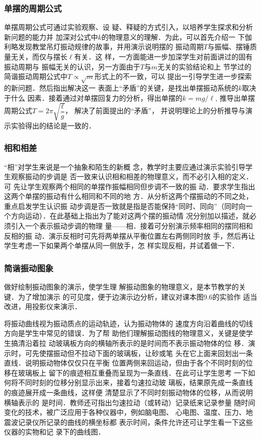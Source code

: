 \subsubsection{单摆的周期公式}

单摆周期公式可通过实验观察、设
疑、释疑的方式引入，以培养学生探求和分析新问题的能力并
加深对公式中$k$的物理意义的理解．为此，可以首先介绍一
下伽利略发现教堂吊灯振动规律的故事，并用演示说明摆的
振动周期$T$与振幅、摆锤质量无关，而仅与摆长$\ell$有关．这
样，一方面能进一步加深学生对前面讲过的固有振动周期与
振幅无关的认识，另一方面由于$T$与$m$无关的实验结论和上
节学过的简谐振动周期公式中$T\propto\sqrt{m}$形式上的不一致，可以
提出一引导学生进一步探索的新问题．然后指出解决这一
表面上“矛盾”的关键，是找出单摆振动系统的$k$取决于什么
因素．接着通过对单摆回复力的分析，得出单摆的$k=mg/\ell$,
推导出单摆周期公式$T=2\pi\sqrt{\dfrac{\ell}{g}}$，
解决了前面提出的“矛盾”，
并说明理论上的分析推导与演示实验得出的结论是一致的．


\subsubsection{相和相差}

“相”对学生来说是一个抽象和陌生的新概
念，教学时主要应通过演示实验引导学生观察振动的步调是
否一致来认识相和相差的物理意义，而不必引入相的定义．可
先让学生观察两个相同的单摆作振幅相同但步调不一致的振
动．要求学生指出这两个单摆的振动有什么相同和不同的地
方．从分析这两个摆振动的不同之处，重点启发学生认识振
动步调是否一致就是指是否能保持“同时、同向”（同时向一
个方向运动）．在此基础上指出为了能对这两个摆的振动情
况分别加以描述，就必须引入一个表示振动步调的物理
量——相．接着可分别演示频率相同的摆同相和反相的振
动．演示反相时可先将两单摆从平衡位置左右两侧同时放
手，然后再让学生考虑一下如果两个单摆从同一侧放手，怎
样实现反相，并试着做一下．

\subsubsection{简谐振动图象}

做好绘制振动图象的演示，使学生理
解振动图象的物理意义，是本节教学的关键．为了增加演示
的可见度，便于边演示边分析，建议对课本图9.6的实验作
适当改进，用投影仪来演示．

将振动曲线视为振动质点的运动轨迹，认为振动物体的
速度方向沿着曲线的切线方向是学生中常见的错误．为了帮
助他们理解振动图线的物理意义，关键是使学生搞清沿着拉
动玻璃板方向的横轴所表示的是时间而不表示振动物体的位
移．演示时，可先使摆振动但不拉动下面的玻璃板，让砂或笔
头在它上面来回划出一条直线．说明振动物体仅仅只在平衡
位置两侧来回运动，但由于各个不同时刻的位移在玻璃板上
留下的痕迹相互重叠而呈现为一条直线．在此可让学生思考
一下如何将不同时刻的位移分别显示出来，接着匀速拉动玻
璃板，结果原先成一条直线的痕迹展开成一条曲线，这样便
清楚显示了不同时刻振动物体的位移，从而说明横轴表示的
是时间．教师还可指出匀速拉动（或转动）记录纸来记录参量
随时间变化的技术，被广泛应用于各种仪器中，例如脑电图、
心电图、温度、压力、地震波记录仪所记录的曲线的横坐标都
表示时间，条件允许还可让学生看一下这些仪器的实物和记
录下的曲线图．


